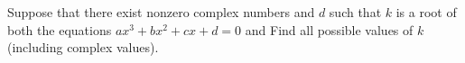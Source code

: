 Suppose that there exist nonzero complex numbers    and $d$ such that $k$ is a root of both the equations $ax^3+bx^2+cx+d=0$ and   Find all possible values of $k$ (including complex values).